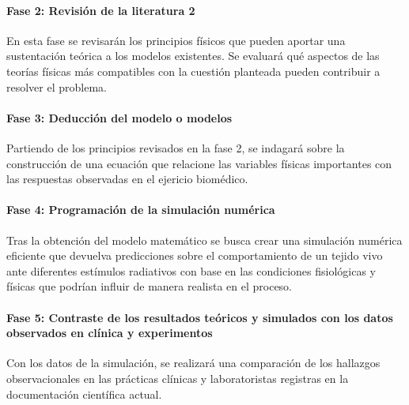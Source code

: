 \documentclass[12pt,letterpaper]{article}
\begin{document}
			\paragraph{Fase 2: Revisión de la literatura 2} En esta fase se revisarán los principios físicos que pueden aportar una sustentación teórica a los modelos existentes. Se evaluará qué aspectos de las teorías físicas más compatibles con la cuestión planteada pueden contribuir a resolver el problema.
			\paragraph{Fase 3: Deducción del modelo o modelos} Partiendo de los principios revisados en la fase 2, se indagará sobre la construcción de una ecuación que relacione las variables físicas importantes con las respuestas observadas en el ejericio biomédico. 
			\paragraph{Fase 4: Programación de la simulación numérica} Tras la obtención del modelo matemático se busca crear una simulación numérica eficiente que devuelva predicciones sobre el comportamiento de un tejido vivo ante diferentes estímulos radiativos con base en las condiciones fisiológicas y físicas que podrían influir de manera realista en el proceso. 
			\paragraph{Fase 5: Contraste de los resultados teóricos y simulados con los datos observados en clínica y experimentos} Con los datos de la simulación, se realizará una comparación de los hallazgos observacionales en las prácticas clínicas y laboratoristas registras en la documentación científica actual. 
			
			
			\nocite{Bleehen1988}
			\nocite{Hall2000}
			\nocite{Saha2006}
			\nocite{Tubiana1990}
			\nocite{CCM2637}
			\nocite{Redondo2014}
			\nocite{Moro2022}
			
			
\end{document}
